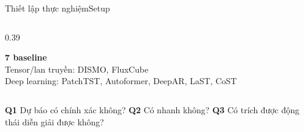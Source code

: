 \begin{frame}{Thiết lập thực nghiệm}{Setup}
\begin{columns}[T,onlytextwidth]
\begin{column}{0.39\textwidth}
\vspace{2mm}
\begin{questioncard}
  \small\textbf{7 baseline}\\
  Tensor/lan truyền: DISMO, FluxCube\\
  Deep learning: PatchTST, Autoformer, DeepAR, LaST, CoST
\end{questioncard}
\end{column}
\end{columns}
\vspace{3mm}
\begin{intuition}
  \small \textbf{Q1} Dự báo có chính xác không? \quad
  \textbf{Q2} Có nhanh không? \quad
  \textbf{Q3} Có trích được động thái diễn giải được không?
\end{intuition}
\vfill
{}
\end{frame}


